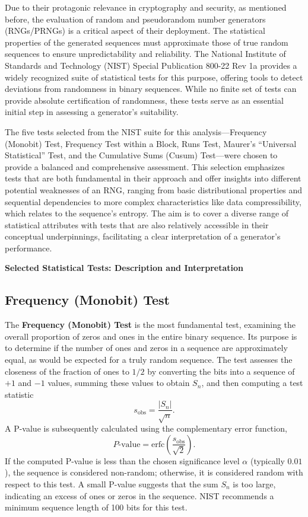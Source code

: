 Due to their protagonic relevance in cryptography and security, as mentioned before, the evaluation of random and pseudorandom number generators (RNGs/PRNGs) is a critical aspect of their deployment. The statistical properties of the generated sequences must approximate those of true random sequences to ensure unpredictability and reliability. The National Institute of Standards and Technology (NIST) Special Publication 800-22 Rev 1a provides a widely recognized suite of statistical tests for this purpose, offering tools to detect deviations from randomness in binary sequences. While no finite set of tests can provide absolute certification of randomness, these tests serve as an essential initial step in assessing a generator's suitability.

The five tests selected from the NIST suite for this analysis---Frequency (Monobit) Test, Frequency Test within a Block, Runs Test, Maurer's ``Universal Statistical'' Test, and the Cumulative Sums (Cusum) Test---were chosen to provide a balanced and comprehensive assessment. This selection emphasizes tests that are both fundamental in their approach and offer insights into different potential weaknesses of an RNG, ranging from basic distributional properties and sequential dependencies to more complex characteristics like data compressibility, which relates to the sequence's entropy. The aim is to cover a diverse range of statistical attributes with tests that are also relatively accessible in their conceptual underpinnings, facilitating a clear interpretation of a generator's performance.

\smallskip

\textbf{Selected Statistical Tests: Description and Interpretation}

\smallskip

\subsection{Frequency (Monobit) Test}

The \textbf{Frequency (Monobit) Test} is the most fundamental test, examining the overall proportion of zeros and ones in the entire binary sequence. Its purpose is to determine if the number of ones and zeros in a sequence are approximately equal, as would be expected for a truly random sequence. The test assesses the closeness of the fraction of ones to $1/2$ by converting the bits into a sequence of $+1$ and $-1$ values, summing these values to obtain $S_n$, and then computing a test statistic
\[
s_{\text{obs}} = \frac{|S_n|}{\sqrt{n}}.
\]
A P-value is subsequently calculated using the complementary error function,
\[
P\text{-value} = \text{erfc}\left(\frac{s_{\text{obs}}}{\sqrt{2}}\right).
\]
If the computed P-value is less than the chosen significance level $\alpha$ (typically $0.01$), the sequence is considered non-random; otherwise, it is considered random with respect to this test. A small P-value suggests that the sum $S_n$ is too large, indicating an excess of ones or zeros in the sequence. NIST recommends a minimum sequence length of 100 bits for this test.

